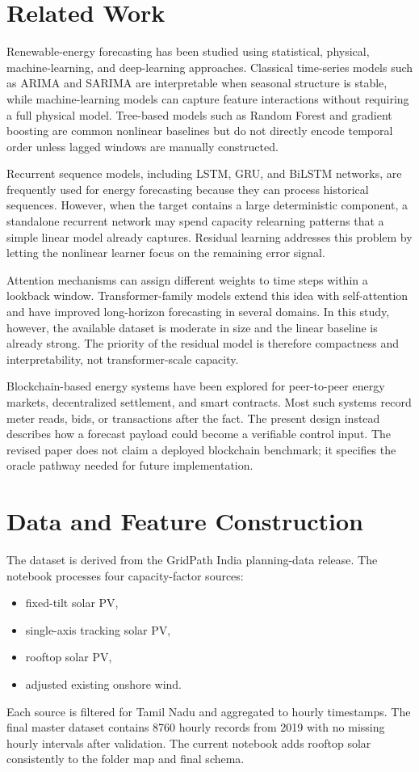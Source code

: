 \documentclass[journal]{IEEEtran}
\begin{document}
\section{Related Work}
Renewable-energy forecasting has been studied using statistical, physical, machine-learning, and deep-learning approaches. Classical time-series models such as ARIMA and SARIMA are interpretable when seasonal structure is stable, while machine-learning models can capture feature interactions without requiring a full physical model. Tree-based models such as Random Forest and gradient boosting are common nonlinear baselines but do not directly encode temporal order unless lagged windows are manually constructed.

Recurrent sequence models, including LSTM, GRU, and BiLSTM networks, are frequently used for energy forecasting because they can process historical sequences. However, when the target contains a large deterministic component, a standalone recurrent network may spend capacity relearning patterns that a simple linear model already captures. Residual learning addresses this problem by letting the nonlinear learner focus on the remaining error signal.

Attention mechanisms can assign different weights to time steps within a lookback window. Transformer-family models extend this idea with self-attention and have improved long-horizon forecasting in several domains. In this study, however, the available dataset is moderate in size and the linear baseline is already strong. The priority of the residual model is therefore compactness and interpretability, not transformer-scale capacity.

Blockchain-based energy systems have been explored for peer-to-peer energy markets, decentralized settlement, and smart contracts. Most such systems record meter reads, bids, or transactions after the fact. The present design instead describes how a forecast payload could become a verifiable control input. The revised paper does not claim a deployed blockchain benchmark; it specifies the oracle pathway needed for future implementation.

\section{Data and Feature Construction}
The dataset is derived from the GridPath India planning-data release. The notebook processes four capacity-factor sources:
\begin{itemize}
\item fixed-tilt solar PV,
\item single-axis tracking solar PV,
\item rooftop solar PV,
\item adjusted existing onshore wind.
\end{itemize}
Each source is filtered for Tamil Nadu and aggregated to hourly timestamps. The final master dataset contains 8760 hourly records from 2019 with no missing hourly intervals after validation. The current notebook adds rooftop solar consistently to the folder map and final schema.
\end{document}
